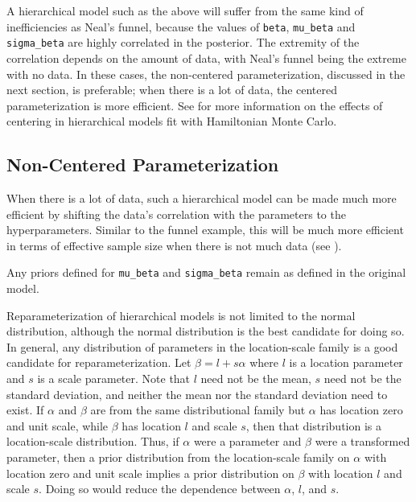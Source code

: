 A hierarchical model such as the above will suffer from the same kind
of inefficiencies as Neal's funnel, because the values of \Verb|beta|,
\Verb|mu_beta| and \Verb|sigma_beta| are highly correlated in the
posterior.  The extremity of the correlation depends on the amount of
data, with Neal's funnel being the extreme with no data.  In these
cases, the non-centered parameterization, discussed in the next
section, is preferable; when there is a lot of data, the centered
parameterization is more efficient.  See
\cite{Betancourt-Girolami:2013} for more information on the effects of
centering in hierarchical models fit with Hamiltonian Monte Carlo.


\subsection{Non-Centered Parameterization}

When there is a lot of data, such a hierarchical model can be made
much more efficient by shifting the data's correlation with the
parameters to the hyperparameters. Similar to the funnel example, this
will be much more efficient in terms of effective sample size when
there is not much data (see \citep{Betancourt-Girolami:2013}).
%
\begin{stancode}
parameters {
  vector[K] beta_raw;
  ...
transformed parameters {
  vector[K] beta;
  // implies: beta ~ normal(mu_beta, sigma_beta)
  beta = mu_beta + sigma_beta * beta_raw;
model {
  beta_raw ~ normal(0, 1);  
  ...
\end{stancode}
%
Any priors defined for \Verb|mu_beta| and \Verb|sigma_beta| remain as
defined in the original model.

Reparameterization of hierarchical models is not limited to the normal
distribution, although the normal distribution is the best candidate
for doing so. In general, any distribution of parameters in the 
location-scale family is a good candidate for reparameterization. Let
$\beta = l + s\alpha$ where $l$ is a location parameter and $s$ is a
scale parameter. Note that $l$ need not be the mean, $s$ need not
be the standard deviation, and neither the mean nor the standard
deviation need to exist. If $\alpha$ and $\beta$ are from the same
distributional family but $\alpha$ has location zero and unit scale, 
while $\beta$ has location $l$ and scale $s$, then that distribution
is a location-scale distribution. Thus, if $\alpha$ were a parameter
and $\beta$ were a transformed parameter, then a prior distribution
from the location-scale family on $\alpha$ with location zero and unit 
scale implies a prior distribution on $\beta$ with location $l$ and
scale $s$. Doing so would reduce the dependence between $\alpha$, 
$l$, and $s$.

